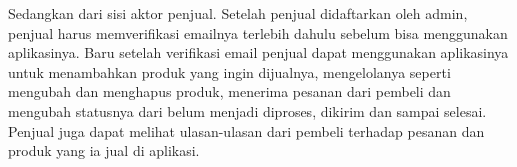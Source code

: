 \par Sedangkan dari sisi aktor penjual. Setelah penjual didaftarkan oleh admin, penjual harus memverifikasi emailnya terlebih dahulu sebelum bisa menggunakan aplikasinya. Baru setelah verifikasi email penjual dapat menggunakan aplikasinya untuk menambahkan produk yang ingin dijualnya, mengelolanya seperti mengubah dan menghapus produk, menerima pesanan dari pembeli dan mengubah statusnya dari belum menjadi diproses, dikirim dan sampai selesai. Penjual juga dapat melihat ulasan-ulasan dari pembeli terhadap pesanan dan produk yang ia jual di aplikasi.






